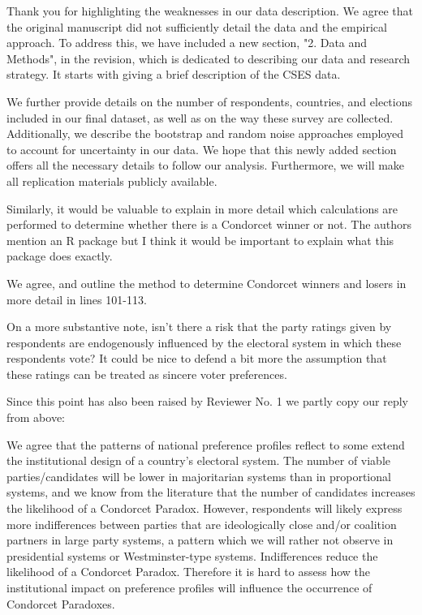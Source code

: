 \documentclass[a4paper, 12pt]{scrartcl}
\theoremstyle{break}
\newenvironment{changes}{\par\color{violet}\par\addvspace{\baselineskip}}{\par\addvspace{\baselineskip}}
\begin{document}
Thank you for highlighting the weaknesses in our data description. We agree that the original manuscript did not sufficiently detail the data and the empirical approach. To address this, we have included a new section, "2. Data and Methods", in the revision, which is dedicated to describing our data and research strategy. It starts with giving a brief description of the CSES data. 

We further provide details on the number of respondents, countries, and elections included in our final dataset, as well as on the way these survey are collected. Additionally, we describe the bootstrap and random noise approaches employed to account for uncertainty in our data. We hope that this newly added section offers all the necessary details to follow our analysis. Furthermore, we will make all replication materials publicly available.

\begin{changes}
Similarly, it would be valuable to explain in more detail which calculations are performed to determine whether there is a Condorcet winner or not. The authors mention an R package but I think it would be important to explain what this package does exactly.
\end{changes}
We agree, and outline the method to determine Condorcet winners and losers in more detail in lines 101-113.

\begin{changes}
	On a more substantive note, isn’t there a risk that the party ratings given by respondents are endogenously influenced by the electoral system in which these respondents vote? It could be nice to defend a bit more the assumption that these ratings can be treated as sincere voter preferences.
\end{changes}
Since this point has also been raised by Reviewer No. 1 we partly copy our reply from above: 

We agree that the patterns of national preference profiles reflect to some extend the institutional design of a country's electoral system. The number of viable parties/candidates will be lower in majoritarian systems than in proportional systems, and we know from the literature that the number of candidates increases the likelihood of a Condorcet Paradox. However, respondents will likely express more indifferences between parties that are ideologically close and/or coalition partners in large party systems, a pattern which we will rather not observe in presidential systems or Westminster-type systems. Indifferences reduce the likelihood of a Condorcet Paradox. Therefore it is hard to assess how the institutional impact on preference profiles will influence the occurrence of Condorcet Paradoxes. 
\end{document}

